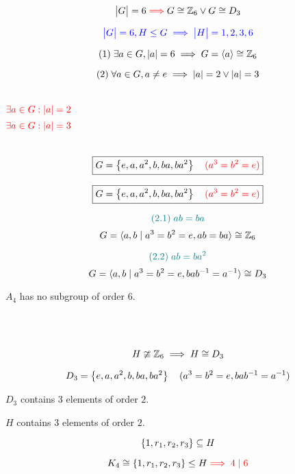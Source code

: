 \begin{frame}
  \begin{theorem}
	\[
	  \big\lvert G \big\rvert = 6 \textcolor{red}{\implies} G \cong \mathbb{Z}_{6} \lor G \cong D_3
	\]
  \end{theorem}

  \pause
  \[
	\textcolor{blue}{\big\lvert G \big\rvert = 6, H \le G \implies \big\lvert H \big\rvert = 1, 2, 3, 6}
  \]

  \pause
  \[
	(1)\; \exists a \in G, \lvert a \rvert = 6 \implies G = \langle a \rangle \cong \mathbb{Z}_{6}
  \]

  \pause
  \vspace{-0.50cm}
  \[
	(2)\; \forall a \in G, a \neq e \implies \lvert a \rvert = 2 \lor \lvert a \rvert = 3
  \]
  
  \pause
  \begin{columns}
	  \[
		\textcolor{red}{\exists a \in G: \lvert a \rvert = 2}
	  \]
	  \[
		\textcolor{red}{\exists a \in G: \lvert a \rvert = 3}
	  \]
  \end{columns}

  \pause
  \vspace{0.60cm}
  \[
	\boxed{G = \left\{e, a, a^2, b, ba, ba^2\right\} \quad \textcolor{red}{(a^3 = b^2 = e)}}
  \]
\end{frame}

\begin{frame}
  \[
	\boxed{G = \left\{e, a, a^2, b, ba, ba^2\right\} \quad \textcolor{red}{(a^3 = b^2 = e)}}
  \]

  \pause
  \[
	\textcolor{teal}{(2.1)\; ab = ba}
  \]
  \pause
  \[
	G = \langle a, b \mid a^3 = b^2 = e, ab = ba \rangle \cong \mathbb{Z}_6
  \]

  \pause
  \[
	\textcolor{teal}{(2.2)\; ab = ba^2}
  \]
  \pause
  \[
	G = \langle a, b \mid a^3 = b^2 = e, bab^{-1} = a^{-1} \rangle \cong D_3
  \]
\end{frame}

\begin{frame}
  \begin{theorem}[Theorem $6.15$]
	$A_4$ has no subgroup of order $6$.
  \end{theorem}

  \pause
  \begin{center}
	 \\[5pt] \pause
	 \\[5pt] \pause

	\[
	  H \ncong \mathbb{Z}_{6} \implies H \cong D_3
	\]

	\pause
	\[
	  D_3 = \left\{e, a, a^2, b, ba, ba^2\right\} \quad (a^3 = b^2 = e, bab^{-1} = a^{-1})
	\]

	\pause
	$D_3$ contains $3$ elements of order $2$.

	\pause
	$H$ contains $3$ elements of order $2$.

	\pause
	\[
	  \left\{1, r_1, r_2, r_3\right\} \subseteq H
	\]

	\pause
	\vspace{-0.60cm}
	\[
	  K_4 \cong \left\{1, r_1, r_2, r_3\right\} \le H \textcolor{red}{\implies 4 \mid 6}
	\]
  \end{center}
\end{frame}

